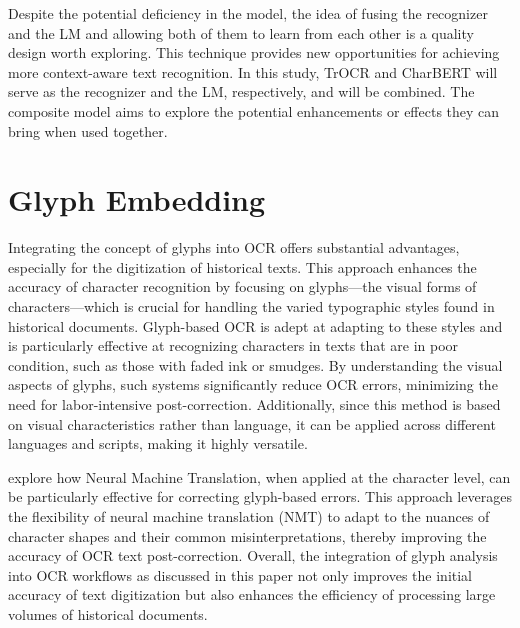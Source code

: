 Despite the potential deficiency in the model, the idea of fusing the recognizer and the LM and allowing both of them to learn from each other is a quality design worth exploring. This technique provides new opportunities for achieving more context-aware text recognition. In this study, TrOCR and CharBERT will serve as the recognizer and the LM, respectively, and will be combined. The composite model aims to explore the potential enhancements or effects they can bring when used together.

\section{Glyph Embedding}
\label{sec:2_glyph_embedding}
Integrating the concept of glyphs into OCR offers substantial advantages, especially for the digitization of historical texts. This approach enhances the accuracy of character recognition by focusing on glyphs—the visual forms of characters—which is crucial for handling the varied typographic styles found in historical documents. Glyph-based OCR is adept at adapting to these styles and is particularly effective at recognizing characters in texts that are in poor condition, such as those with faded ink or smudges. By understanding the visual aspects of glyphs, such systems significantly reduce OCR errors, minimizing the need for labor-intensive post-correction. Additionally, since this method is based on visual characteristics rather than language, it can be applied across different languages and scripts, making it highly versatile.

\cite{amrhein2018supervised} explore how Neural Machine Translation, when applied at the character level, can be particularly effective for correcting glyph-based errors. This approach leverages the flexibility of neural machine translation (NMT) to adapt to the nuances of character shapes and their common misinterpretations, thereby improving the accuracy of OCR text post-correction. Overall, the integration of glyph analysis into OCR workflows as discussed in this paper not only improves the initial accuracy of text digitization but also enhances the efficiency of processing large volumes of historical documents.